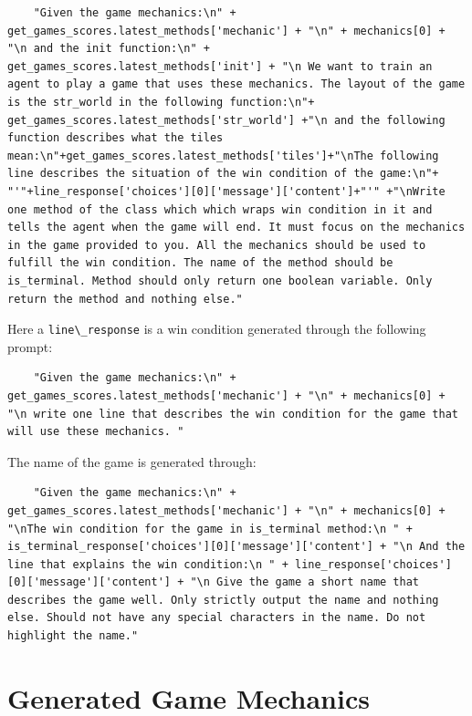 \documentclass{article} %
\begin{document}
\begin{lstlisting}
    "Given the game mechanics:\n" + get_games_scores.latest_methods['mechanic'] + "\n" + mechanics[0] + "\n and the init function:\n" + get_games_scores.latest_methods['init'] + "\n We want to train an agent to play a game that uses these mechanics. The layout of the game is the str_world in the following function:\n"+ get_games_scores.latest_methods['str_world'] +"\n and the following function describes what the tiles mean:\n"+get_games_scores.latest_methods['tiles']+"\nThe following line describes the situation of the win condition of the game:\n"+ "'"+line_response['choices'][0]['message']['content']+"'" +"\nWrite one method of the class which which wraps win condition in it and tells the agent when the game will end. It must focus on the mechanics in the game provided to you. All the mechanics should be used to fulfill the win condition. The name of the method should be is_terminal. Method should only return one boolean variable. Only return the method and nothing else."
\end{lstlisting}

Here a \lstinline|line\_response| is a win condition generated through the following prompt:

\begin{lstlisting}
    "Given the game mechanics:\n" + get_games_scores.latest_methods['mechanic'] + "\n" + mechanics[0] + "\n write one line that describes the win condition for the game that will use these mechanics. "
\end{lstlisting}

The name of the game is generated through:

\begin{lstlisting}
    "Given the game mechanics:\n" + get_games_scores.latest_methods['mechanic'] + "\n" + mechanics[0] + "\nThe win condition for the game in is_terminal method:\n " + is_terminal_response['choices'][0]['message']['content'] + "\n And the line that explains the win condition:\n " + line_response['choices'][0]['message']['content'] + "\n Give the game a short name that describes the game well. Only strictly output the name and nothing else. Should not have any special characters in the name. Do not highlight the name."
\end{lstlisting}


\section{Generated Game Mechanics} 
\label{appendixB}
\end{document}
